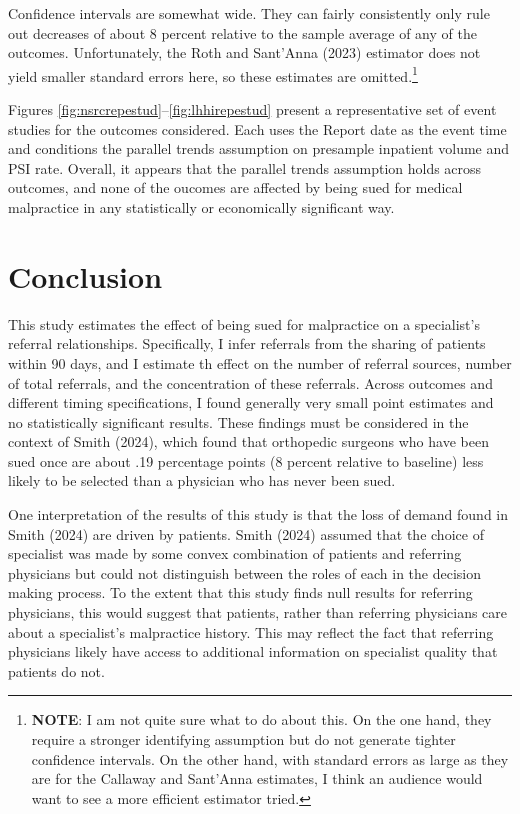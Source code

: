\documentclass[
  12pt,
]{article}
\begin{document}
Confidence intervals are somewhat wide. They can fairly consistently only rule out decreases of about 8 percent relative to the sample average of any of the outcomes. Unfortunately, the Roth and Sant'Anna (2023) estimator does not yield smaller standard errors here, so these estimates are omitted.\footnote{\textbf{NOTE}: I am not quite sure what to do about this. On the one hand, they require a stronger identifying assumption but do not generate tighter confidence intervals. On the other hand, with standard errors as large as they are for the Callaway and Sant'Anna estimates, I think an audience would want to see a more efficient estimator tried.}

Figures \ref{fig:nsrcrepestud}--\ref{fig:lhhirepestud} present a representative set of event studies for the outcomes considered. Each uses the Report date as the event time and conditions the parallel trends assumption on presample inpatient volume and PSI rate. Overall, it appears that the parallel trends assumption holds across outcomes, and none of the oucomes are affected by being sued for medical malpractice in any statistically or economically significant way.

\hypertarget{conclusion}{%
\section{Conclusion}\label{conclusion}}

This study estimates the effect of being sued for malpractice on a specialist's referral relationships. Specifically, I infer referrals from the sharing of patients within 90 days, and I estimate th effect on the number of referral sources, number of total referrals, and the concentration of these referrals. Across outcomes and different timing specifications, I found generally very small point estimates and no statistically significant results. These findings must be considered in the context of Smith (2024), which found that orthopedic surgeons who have been sued once are about .19 percentage points (8 percent relative to baseline) less likely to be selected than a physician who has never been sued.

One interpretation of the results of this study is that the loss of demand found in Smith (2024) are driven by patients. Smith (2024) assumed that the choice of specialist was made by some convex combination of patients and referring physicians but could not distinguish between the roles of each in the decision making process. To the extent that this study finds null results for referring physicians, this would suggest that patients, rather than referring physicians care about a specialist's malpractice history. This may reflect the fact that referring physicians likely have access to additional information on specialist quality that patients do not.
\end{document}
